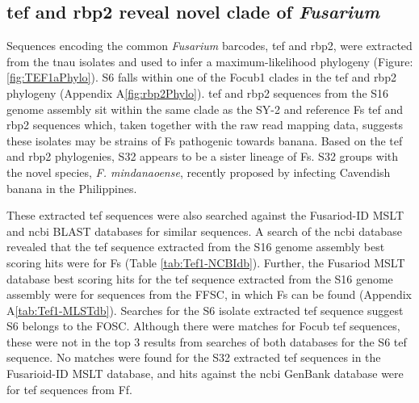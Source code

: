 \subsection{\acl{tef} and \acl{rbp2} reveal novel clade of \textit{Fusarium}}

 Sequences encoding the common \textit{Fusarium} barcodes, \ac{tef}  and \acf{rbp2}, were extracted from the \ac{tnau} isolates and used to infer a maximum-likelihood phylogeny (Figure: \ref{fig:TEF1aPhylo}). S6 falls within one of the \ac{Focub1} clades in the \acs{tef} and \ac{rbp2} phylogeny (Appendix A\ref{fig:rbp2Phylo}). \Ac{tef} and \ac{rbp2} sequences from the S16 genome assembly sit within the same clade as the SY-2 and reference \ac{Fs} \ac{tef} and \ac{rbp2} sequences which, taken together with the raw read mapping data, suggests these isolates may be strains of \ac{Fs} pathogenic towards banana. Based on the \ac{tef} and \ac{rbp2} phylogenies, S32 appears to be a sister lineage of \ac{Fs}. S32 groups with the novel species, \textit{F. mindanaoense}, recently proposed by  \textcite{Nozawa2023} infecting Cavendish banana in the Philippines. 

These extracted \ac{tef} sequences were also searched against the Fusariod-ID MSLT and \ac{ncbi} BLAST databases for similar sequences. A search of the \ac{ncbi} database revealed that the \ac{tef} sequence extracted from the S16 genome assembly best scoring hits were for \ac{Fs} (Table \ref{tab:Tef1-NCBIdb}). Further, the Fusariod MSLT database best scoring hits for the \ac{tef} sequence extracted from the S16 genome assembly were for sequences from the \ac{FFSC}, in which \ac{Fs} can be found (Appendix A\ref{tab:Tef1-MLSTdb}). Searches for the S6 isolate extracted \ac{tef} sequence suggest S6 belongs to the \ac{FOSC}. Although there were matches for \ac{Focub} \ac{tef} sequences, these were not in the top 3 results from searches of both databases for the S6 \ac{tef} sequence. No matches were found for the S32 extracted \ac{tef} sequences in the Fusarioid-ID MSLT database, and hits against the \ac{ncbi} GenBank database were for \ac{tef} sequences from \ac{Ff}. 



